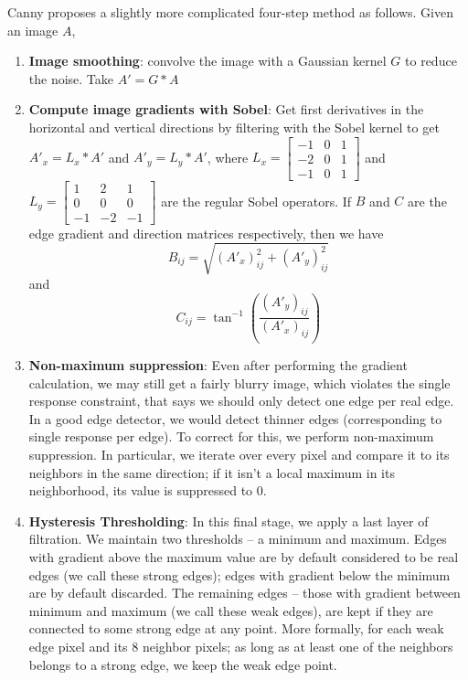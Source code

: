 \documentclass[a4paper, 12pt]{article}
\numberwithin{equation}{section}
\begin{document}
Canny proposes a slightly more complicated four-step method as follows. Given an image $A$,
\begin{enumerate}
\item \textbf{Image smoothing}: convolve the image with a Gaussian kernel $G$ to reduce the noise. Take $A' = G * A$
\item  \textbf{Compute image gradients with Sobel}: Get first derivatives in the horizontal and vertical directions by filtering with the Sobel kernel to get $A'_x = L_x * A'$ and $A'_y = L_y * A'$, where $L_x = \begin{bmatrix}
-1 & 0 & 1 \\ -2 & 0 & 1 \\ -1 & 0 & 1\end{bmatrix}$ and $L_y = \begin{bmatrix}1 & 2  &1 \\ 0 & 0 & 0 \\ -1 & -2 & -1\end{bmatrix}$ are the regular Sobel operators. If $B$ and $C$ are the edge gradient and direction matrices respectively, then we have $$B_{ij} = \sqrt{(A'_{x})_{ij}^2 + (A'_{y})_{ij}^2}$$ and $$C_{ij} = \tan^{-1}(\dfrac{(A'_y)_{ij}}{(A'_x)_{ij}})$$
\item \textbf{Non-maximum suppression}: Even after performing the gradient calculation, we may still get a fairly blurry image, which violates the single response constraint, that says we should only detect one edge per real edge. In a good edge detector, we would detect thinner edges (corresponding to single response per edge). To correct for this, we perform non-maximum suppression. In particular, we iterate over every pixel and compare it to its neighbors in the same direction; if it isn't a local maximum in its neighborhood, its value is suppressed to $0$.
\item \textbf{Hysteresis Thresholding}: In this final stage, we apply a last layer of filtration. We maintain two thresholds -- a minimum and maximum. Edges with gradient above the maximum value are by default considered to be real edges (we call these strong edges); edges with gradient below the minimum are by default discarded. The remaining edges -- those with gradient between minimum and maximum (we call these weak edges), are kept if they are connected to some strong edge at any point. More formally, for each weak edge pixel and its 8 neighbor pixels; as long as at least one of the neighbors belongs to a strong edge, we keep the weak edge point. 
\end{enumerate}
\end{document}
